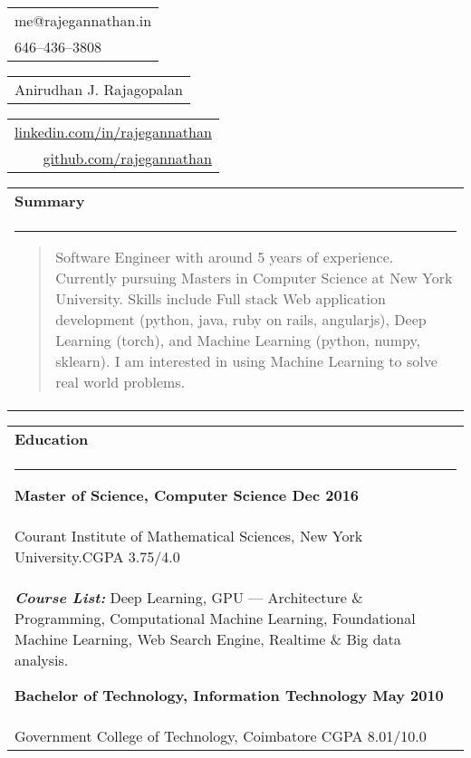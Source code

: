 \documentclass{article}
\begin{document}
{\small\begin{tabular}[c]{l}
	me@rajegannathan.in \\
	646--436--3808
\end{tabular}}\hfill%
{\Large\bfseries\begin{tabular}[c]{c}
	Anirudhan J. Rajagopalan
\end{tabular}}\hfill%
{\small\begin{tabular}[c]{r}
	\href{https://linkedin.com/in/rajegannathan}{linkedin.com/in/rajegannathan} \\
	\href{https://github.com/rajegannathan}{github.com/rajegannathan}
\end{tabular}}%

\bigskip

\begin{tabular}{p{\dimexpr\linewidth-2\tabcolsep}}
	\textbf{\large{Summary}}\\
	\noindent\rule{\textwidth}{0.4pt}
	\begin{quote}
	\small{Software Engineer with around 5 years of experience.  Currently pursuing Masters in Computer Science at New York University.  Skills include Full stack Web application development (python, java, ruby on rails, angularjs), Deep Learning (torch), and Machine Learning (python, numpy, sklearn).  I am interested in using Machine Learning to solve real world problems.}
	\end{quote}
\end{tabular}

\begin{tabular}{p{\dimexpr\linewidth-2\tabcolsep}}
	\textbf{\large{Education}} \\
	\noindent\rule{\textwidth}{0.4pt}
	{\bfseries Master of Science, Computer Science \hfill Dec 2016} \\
	\quad Courant Institute of Mathematical Sciences, New York University.\hfill CGPA 3.75/4.0\\
	\quad \textbf{\textit{Course List:}} Deep Learning, GPU --- Architecture \& Programming, Computational Machine Learning, Foundational Machine Learning, Web Search Engine, Realtime \& Big data analysis.

	\smallskip
	{\bfseries Bachelor of Technology, Information Technology \hfill May 2010} \\
	\quad Government College of Technology, Coimbatore \hfill CGPA 8.01/10.0
\end{tabular}

\bigskip
\end{document}
